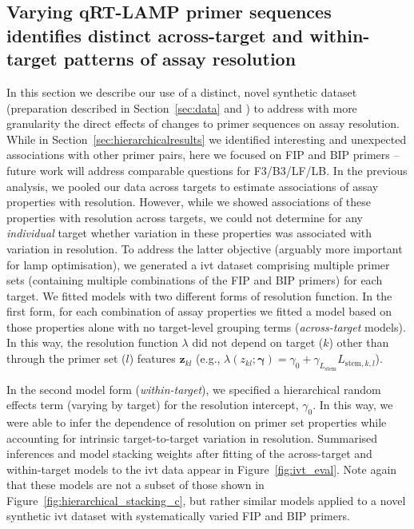 \documentclass[../thesis.tex]{subfiles}
\begin{document}
\subsection{Varying qRT-LAMP primer sequences identifies distinct across-target and within-target patterns of assay resolution \label{sec:ivt_results}}
In this section we describe our use of a distinct, novel synthetic dataset (preparation described in Section~\ref{sec:data} and \citealp{remmel_diagnostic_2022}) to address with more granularity the direct effects of changes to primer sequences on assay resolution. While in Section~\ref{sec:hierarchicalresults} we identified interesting and unexpected associations with other primer pairs, here we focused on FIP and BIP primers -- future work will address comparable questions for F3/B3/LF/LB. In the previous analysis, we pooled our data across targets to estimate associations of assay properties with resolution. However, while we showed associations of these properties with resolution across targets, we could not determine for any \emph{individual} target whether variation in these properties was associated with variation in resolution. To address the latter objective (arguably more important for \gls{lamp} optimisation), we generated a \gls{ivt}  dataset comprising multiple primer sets (containing multiple combinations of the FIP and BIP primers) for each target. We fitted models with two different forms of resolution function. In the first form, for each combination of assay properties we fitted a model based on those properties alone with no target-level grouping terms (\emph{across-target} models). In this way, the resolution function $\lambda$ did not depend on target ($k$) other than through the primer set ($l$) features $\bm{z}_{kl}$ (e.g., $\lambda(z_{kl}; \bm{\gamma}) = \gamma_0 + \gamma_{L_{\text{stem}}} L_{\text{stem},k,l}$).
 
In the second model form (\emph{within-target}), we specified a hierarchical random effects term (varying by target) for the resolution intercept, $\gamma_0$. In this way, we were able to infer the dependence of resolution on primer set properties while accounting for intrinsic target-to-target variation in resolution. Summarised inferences and model stacking weights after fitting of the across-target and within-target models to the \gls{ivt}  data appear in Figure~\ref{fig:ivt_eval}. Note again that these models are not a subset of those shown in Figure~\ref{fig:hierarchical_stacking_c}, but rather similar models applied to a novel synthetic \gls{ivt} dataset with systematically varied FIP and BIP primers.
\end{document}
